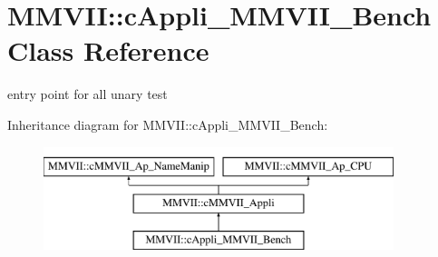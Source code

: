 \hypertarget{classMMVII_1_1cAppli__MMVII__Bench}{}\section{M\+M\+V\+II\+:\+:c\+Appli\+\_\+\+M\+M\+V\+I\+I\+\_\+\+Bench Class Reference}
\label{classMMVII_1_1cAppli__MMVII__Bench}


entry point for all unary test  


Inheritance diagram for M\+M\+V\+II\+:\+:c\+Appli\+\_\+\+M\+M\+V\+I\+I\+\_\+\+Bench\+:\begin{figure}[H]
\begin{center}
\leavevmode
\includegraphics[height=3.000000cm]{classMMVII_1_1cAppli__MMVII__Bench}
\end{center}
\end{figure}
